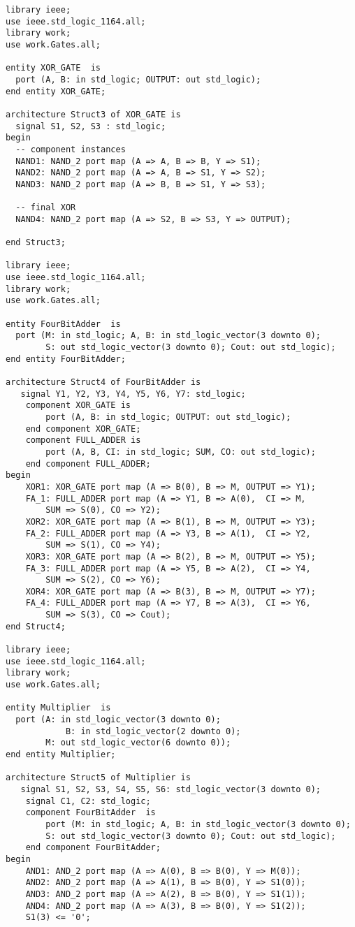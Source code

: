 \documentclass[12pt]{article}
\begin{document}
\begin{verbatim}
library ieee;
use ieee.std_logic_1164.all;
library work;
use work.Gates.all;

entity XOR_GATE  is
  port (A, B: in std_logic; OUTPUT: out std_logic);
end entity XOR_GATE;

architecture Struct3 of XOR_GATE is
  signal S1, S2, S3 : std_logic;
begin
  -- component instances
  NAND1: NAND_2 port map (A => A, B => B, Y => S1);
  NAND2: NAND_2 port map (A => A, B => S1, Y => S2);
  NAND3: NAND_2 port map (A => B, B => S1, Y => S3);
  
  -- final XOR
  NAND4: NAND_2 port map (A => S2, B => S3, Y => OUTPUT);
  
end Struct3;

library ieee;
use ieee.std_logic_1164.all;
library work;
use work.Gates.all;

entity FourBitAdder  is
  port (M: in std_logic; A, B: in std_logic_vector(3 downto 0);
       	S: out std_logic_vector(3 downto 0); Cout: out std_logic); 
end entity FourBitAdder;

architecture Struct4 of FourBitAdder is
   signal Y1, Y2, Y3, Y4, Y5, Y6, Y7: std_logic;
	component XOR_GATE is
		port (A, B: in std_logic; OUTPUT: out std_logic);
	end component XOR_GATE;
	component FULL_ADDER is
		port (A, B, CI: in std_logic; SUM, CO: out std_logic);
	end component FULL_ADDER;
begin	
	XOR1: XOR_GATE port map (A => B(0), B => M, OUTPUT => Y1);
	FA_1: FULL_ADDER port map (A => Y1, B => A(0),  CI => M, 
		SUM => S(0), CO => Y2);
	XOR2: XOR_GATE port map (A => B(1), B => M, OUTPUT => Y3);
	FA_2: FULL_ADDER port map (A => Y3, B => A(1),  CI => Y2, 
		SUM => S(1), CO => Y4);
	XOR3: XOR_GATE port map (A => B(2), B => M, OUTPUT => Y5);
	FA_3: FULL_ADDER port map (A => Y5, B => A(2),  CI => Y4, 
		SUM => S(2), CO => Y6);
	XOR4: XOR_GATE port map (A => B(3), B => M, OUTPUT => Y7);
	FA_4: FULL_ADDER port map (A => Y7, B => A(3),  CI => Y6, 
		SUM => S(3), CO => Cout);
end Struct4;

library ieee;
use ieee.std_logic_1164.all;
library work;
use work.Gates.all;

entity Multiplier  is
  port (A: in std_logic_vector(3 downto 0);
			B: in std_logic_vector(2 downto 0);
       	M: out std_logic_vector(6 downto 0)); 
end entity Multiplier;

architecture Struct5 of Multiplier is
   signal S1, S2, S3, S4, S5, S6: std_logic_vector(3 downto 0);
	signal C1, C2: std_logic;
	component FourBitAdder  is
		port (M: in std_logic; A, B: in std_logic_vector(3 downto 0); 
		S: out std_logic_vector(3 downto 0); Cout: out std_logic); 
	end component FourBitAdder;
begin	
	AND1: AND_2 port map (A => A(0), B => B(0), Y => M(0));
	AND2: AND_2 port map (A => A(1), B => B(0), Y => S1(0));
	AND3: AND_2 port map (A => A(2), B => B(0), Y => S1(1));
	AND4: AND_2 port map (A => A(3), B => B(0), Y => S1(2));
	S1(3) <= '0';
	

\end{verbatim}
\end{document}
